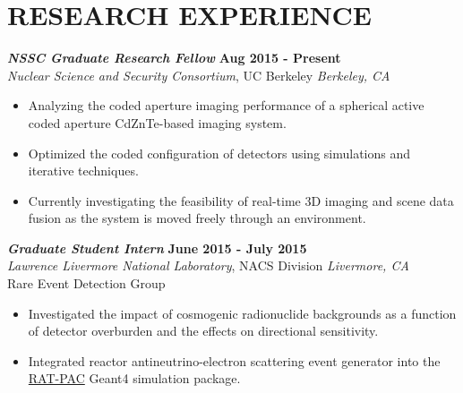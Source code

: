 \section{\small{RESEARCH EXPERIENCE}}

{\sl\bf NSSC Graduate Research Fellow} \hfill {\bf Aug 2015 - Present} \\
{\sl Nuclear Science and Security Consortium}, UC Berkeley \hfill {\sl Berkeley, CA} %
\vspace{2pt}
\begin{itemize}[leftmargin=4ex] \itemsep -2pt
\item Analyzing the coded aperture imaging performance of a spherical active coded aperture CdZnTe-based imaging system.
\item Optimized the coded configuration of detectors using simulations and iterative techniques.
\item Currently investigating the feasibility of real-time 3D imaging and scene data fusion as the system is moved freely through an environment.   
\end{itemize} 

{\sl\bf Graduate Student Intern} \hfill {\bf June 2015 - July 2015} \\
{\sl Lawrence Livermore National Laboratory}, NACS Division \hfill {\sl Livermore, CA} \\
Rare Event Detection Group
\vspace{2pt}
\begin{itemize}[leftmargin=4ex] \itemsep -2pt
\item Investigated the impact of cosmogenic radionuclide backgrounds as a function of detector overburden and the effects on directional sensitivity.
\item Integrated reactor antineutrino-electron scattering event generator into the \href{https://github.com/rat-pac/rat-pac}{RAT-PAC} Geant4 simulation package.
\end{itemize} 

